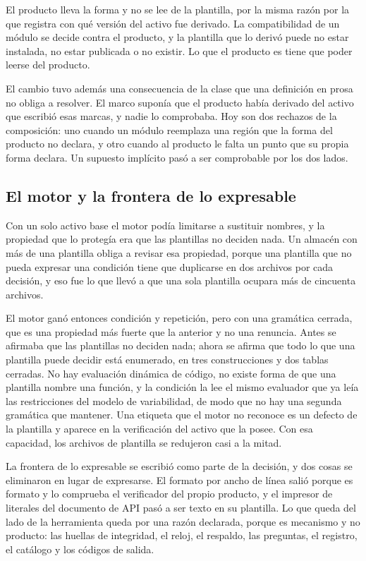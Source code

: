 El producto lleva la forma y no se lee de la plantilla, por la misma razón
por la que registra con qué versión del activo fue derivado. La
compatibilidad de un módulo se decide contra el producto, y la plantilla que
lo derivó puede no estar instalada, no estar publicada o no existir. Lo que
el producto es tiene que poder leerse del producto.

El cambio tuvo además una consecuencia de la clase que una definición en prosa
no obliga a resolver. El marco suponía que
el producto había derivado del activo que escribió esas marcas, y nadie lo
comprobaba. Hoy son dos rechazos de la composición: uno cuando un módulo
reemplaza una región que la forma del producto no declara, y otro cuando al
producto le falta un punto que su propia forma declara. Un supuesto implícito
pasó a ser comprobable por los dos lados.

\subsection{El motor y la frontera de lo expresable}

Con un solo activo base el motor podía limitarse a sustituir nombres, y la
propiedad que lo protegía era que las plantillas no deciden nada. Un almacén
con más de una plantilla obliga a revisar esa propiedad, porque una plantilla
que no pueda expresar una condición tiene que duplicarse en dos archivos por
cada decisión, y eso fue lo que llevó a que una sola plantilla ocupara más de
cincuenta archivos.

El motor ganó entonces condición y repetición, pero con una gramática
cerrada, que es una propiedad más fuerte que la anterior y no una renuncia.
Antes se afirmaba que las plantillas no deciden nada; ahora se afirma que
todo lo que una plantilla puede decidir está enumerado, en tres
construcciones y dos tablas cerradas. No hay evaluación dinámica de código,
no existe forma de que una plantilla nombre una función, y la condición la
lee el mismo evaluador que ya leía las restricciones del modelo de
variabilidad, de modo que no hay una segunda gramática que mantener. Una
etiqueta que el motor no reconoce es un defecto de la plantilla y aparece en
la verificación del activo que la posee. Con esa capacidad, los archivos de
plantilla se redujeron casi a la mitad.

La frontera de lo expresable se escribió como parte de la decisión, y dos
cosas se eliminaron en lugar de expresarse. El formato por ancho de línea
salió porque es formato y lo comprueba el verificador del propio producto, y
el impresor de literales del documento de API pasó a ser texto en su
plantilla. Lo que queda del lado de la herramienta queda por una razón
declarada, porque es mecanismo y no producto: las huellas de integridad, el
reloj, el respaldo, las preguntas, el registro, el catálogo y los códigos de
salida.


